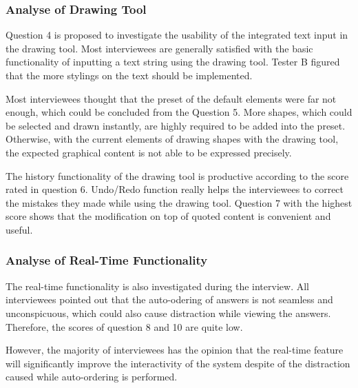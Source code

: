 \subsubsection{Analyse of Drawing Tool }
Question 4 is proposed to investigate the usability of the integrated text input in the drawing tool. Most interviewees are generally satisfied with the basic functionality of inputting a text string using the drawing tool. Tester B figured that the more stylings on the text should be implemented.

Most interviewees thought that the preset of the default elements were far not enough, which could be concluded from the Question 5. More shapes, which could be selected and drawn instantly, are highly required to be added into the preset. Otherwise, with the current elements of drawing shapes with the drawing tool, the expected graphical content is not able to be expressed precisely.

The history functionality of the drawing tool is productive according to the score rated in question 6. Undo/Redo function really helps the interviewees to correct the mistakes they made while using the drawing tool. Question 7 with the highest score shows that the modification on top of quoted content is convenient and useful.

\subsubsection{Analyse of Real-Time Functionality}

The real-time functionality is also investigated during the interview. All interviewees pointed out that the auto-odering of answers is not seamless and unconspicuous, which could also cause distraction while viewing the answers. Therefore, the scores of question 8 and 10 are quite low.

However, the majority of interviewees has the opinion that the real-time feature will significantly improve the interactivity of the system despite of the distraction caused while auto-ordering is performed.


